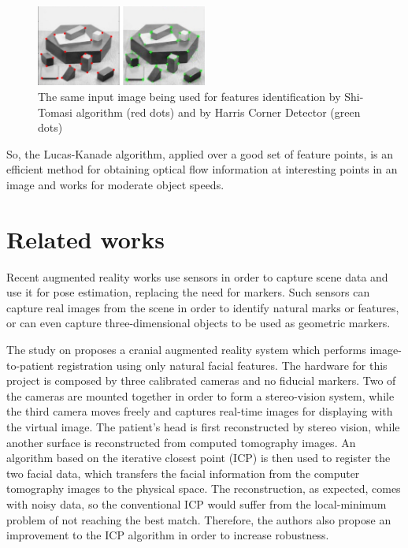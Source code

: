 \documentclass[msc, a4paper, classic, en]{ufbathesis}
\begin{document}
\begin{figure}
\centering
\includegraphics[width=0.5\textwidth]{images/shi-harris.png}
\caption{The same input image being used for features identification by Shi-Tomasi algorithm (red dots) and by Harris Corner Detector (green dots)}
\label{fig:shi-harris}
\end{figure}

So, the Lucas-Kanade algorithm, applied over a good set of feature points, is an efficient method for obtaining optical flow information at interesting points in an image and works for moderate object speeds.

\section{Related works}

Recent augmented reality works use sensors in order to capture scene data and use it for pose estimation, replacing the need for markers. Such sensors can capture real images from the scene in order to identify natural marks or features, or can even capture three-dimensional objects to be used as geometric markers.

The study on \cite{Lee20125286} proposes a cranial augmented reality system which performs image-to-patient registration using only natural facial features. The hardware for this project is composed by three calibrated cameras and no fiducial markers. Two of the cameras are mounted together in order to form a stereo-vision system, while the third camera moves freely and captures real-time images for displaying with the virtual image. The patient's head is first reconstructed by stereo vision, while another surface is reconstructed from computed tomography images. An algorithm based on the iterative closest point (ICP) is then used to register the two facial data, which transfers the facial information from the computer tomography images to the physical space. The reconstruction, as expected, comes with noisy data, so the conventional ICP would suffer from the local-minimum problem of not reaching the best match. Therefore, the authors also propose an improvement to the ICP algorithm in order to increase robustness.
\end{document}
